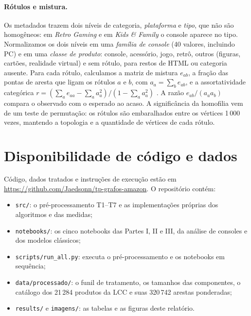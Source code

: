 \documentclass[sigconf,nonacm]{webmedia}
\begin{document}
\paragraph{Rótulos e mistura.}
Os metadados trazem dois níveis de categoria, \emph{plataforma} e
\emph{tipo}, que não são homogêneos: em \emph{Retro Gaming} e em
\emph{Kids \& Family} o console aparece no tipo. Normalizamos os dois
níveis em uma \emph{família de console} (40 valores, incluindo PC) e
em uma \emph{classe de produto}: console, acessório, jogo, retrô,
outros (figuras, cartões, realidade virtual) e sem rótulo, para
restos de HTML ou categoria ausente. Para cada rótulo, calculamos a
matriz de mistura \(e_{ab}\), a fração das pontas de aresta que ligam
os rótulos \(a\) e \(b\), com \(a_a=\sum_b e_{ab}\), e a
assortatividade categórica
\(r=(\sum_a e_{aa}-\sum_a a_a^2)/(1-\sum_a a_a^2)\)
\cite{barabasi2016}. A razão \(e_{ab}/(a_a a_b)\) compara o observado
com o esperado ao acaso. A significância da homofilia vem de um teste
de permutação: os rótulos são embaralhados entre os vértices 1\,000
vezes, mantendo a topologia e a quantidade de vértices de cada
rótulo.

\section{Disponibilidade de código e dados}
\label{sec:disponibilidade}

{\sloppy
Código, dados tratados e instruções de execução estão em
\url{https://github.com/Jaedsonn/tp-grafos-amazon}. O repositório
contém:

\begin{itemize}
  \item \texttt{src/}: o pré-processamento T1--T7 e as implementações
  próprias dos algoritmos e das medidas;
  \item \texttt{notebooks/}: os cinco notebooks das Partes I, II e
  III, da análise de consoles e dos modelos clássicos;
  \item \texttt{scripts/run\_all.py}: executa o pré-processamento e os
  notebooks em sequência;
  \item \texttt{data/processado/}: o funil de tratamento, os tamanhos
  das componentes, o catálogo dos 21\,284 produtos da LCC e suas
  320\,742 arestas ponderadas;
  \item \texttt{results/} e \texttt{imagens/}: as tabelas e as figuras
  deste relatório.
\end{itemize}
\par}
\end{document}
